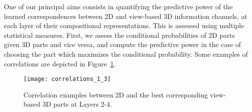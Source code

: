 \documentclass[conference]{IEEEtran}
\begin{document}


%

One of our principal aims consists in quantifying the predictive power of the learned correspondences between 2D and view-based 3D information channels, at each layer of their compositional representations. This is assessed using multiple statistical measures. First, we assess the conditional probabilities of 2D parts given 3D parts and vice versa, and compute the predictive power in the case of choosing the part which maximizes the conditional probability. Some examples of correlations are depicted in Figure~\ref{correlations}.

\begin{figure}
\begin{center}
\texttt{[image: correlations\_1\_3]}
\end{center}
\caption{Correlation examples between 2D and the best corresponding view-based 3D parts at Layers 2-4.}
\label{correlations}
\end{figure}
\end{document}
